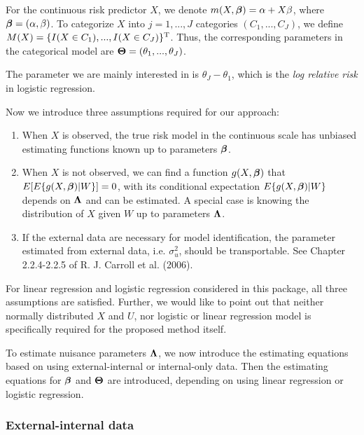 \documentclass[15 pt,]{article}
\begin{document}
For the continuous risk predictor \(X\), we denote
\(m(X, \mbox{\boldmath $\beta$}) = \alpha + X \beta\), where
\(\mbox{\boldmath $\beta$} = ( \alpha, \beta)\). To categorize \(X\) into \(j = 1,..., J\)
categories \((C_1, ..., C_J)\), we define
\(M(X) = \{ I(X\in C_1),..., I(X\in C_J)\}^{\rm T}\). Thus, the
corresponding parameters in the categorical model are
\(\mbox{\boldmath $\Theta$} = (\theta_1,..., \theta_J)\).

The parameter we are mainly interested in is \(\theta_J - \theta_1\),
which is the \emph{log relative risk} in logistic regression.

Now we introduce three assumptions required for our approach:

\begin{enumerate}
\def\labelenumi{(\alph{enumi})}
\item
  When \(X\) is observed, the true risk model in the continuous scale
  has unbiased estimating functions known up to parameters \(\mbox{\boldmath $\beta$}\).
\item
  When \(X\) is not observed, we can find a function \(g(X, \mbox{\boldmath $\beta$})\)
  that \(E[E\{g(X, \mbox{\boldmath $\beta$})|W\}]=0\), with its conditional expectation
  \(E\{g(X, \mbox{\boldmath $\beta$})|W\}\) depends on \(\mbox{\boldmath $\Lambda$}\) and can be estimated.
  A special case is knowing the distribution of \(X\) given \(W\) up to
  parameters \(\mbox{\boldmath $\Lambda$}\).
\item
  If the external data are necessary for model identification, the
  parameter estimated from external data, i.e. \(\sigma^2_u\), should be
  transportable. See Chapter 2.2.4-2.2.5 of R. J. Carroll et al. (2006).
\end{enumerate}

For linear regression and logistic regression considered in this
package, all three assumptions are satisfied. Further, we would like to
point out that neither normally distributed \(X\) and \(U\), nor
logistic or linear regression model is specifically required for the
proposed method itself.

To estimate nuisance parameters \(\mbox{\boldmath $\Lambda$}\), we now introduce the
estimating equations based on using external-internal or internal-only
data. Then the estimating equations for \(\mbox{\boldmath $\beta$}\) and \(\mbox{\boldmath $\Theta$}\) are
introduced, depending on using linear regression or logistic regression.

\subsubsection{External-internal data}\label{external-internal-data}
\end{document}
